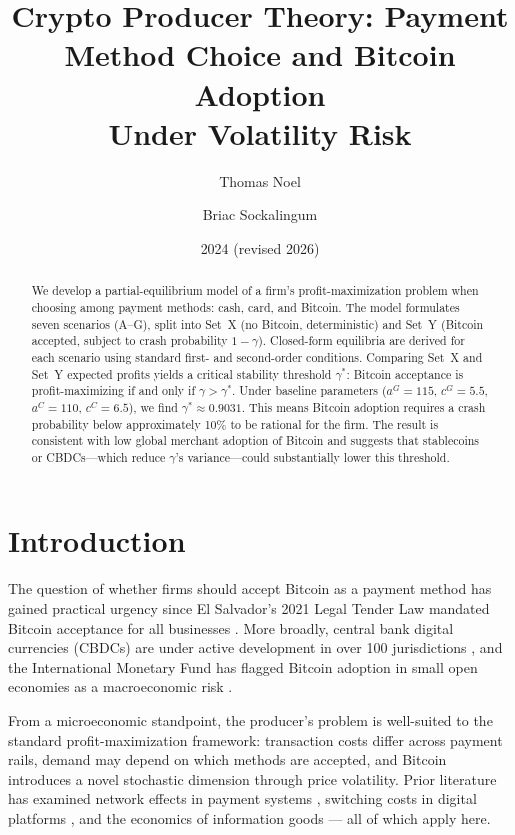\documentclass{article}
\title{Crypto Producer Theory: Payment Method Choice and Bitcoin Adoption\\
       Under Volatility Risk}
\author{Thomas Noel \and Briac Sockalingum}
\date{2024 (revised 2026)}
\begin{document}
\maketitle

\begin{abstract}
We develop a partial-equilibrium model of a firm's profit-maximization problem
when choosing among payment methods: cash, card, and Bitcoin.
The model formulates seven scenarios (A--G), split into Set~X (no Bitcoin,
deterministic) and Set~Y (Bitcoin accepted, subject to crash probability
$1 - \gamma$).
Closed-form equilibria are derived for each scenario using standard first- and
second-order conditions.
Comparing Set~X and Set~Y expected profits yields a critical stability threshold
$\gamma^*$: Bitcoin acceptance is profit-maximizing if and only if $\gamma > \gamma^*$.
Under baseline parameters ($a^G = 115$, $c^G = 5.5$, $a^C = 110$, $c^C = 6.5$),
we find $\gamma^* \approx 0.9031$.
This means Bitcoin adoption requires a crash probability below approximately 10\%
to be rational for the firm.
The result is consistent with low global merchant adoption of Bitcoin and
suggests that stablecoins or CBDCs---which reduce $\gamma$'s variance---could
substantially lower this threshold.
\end{abstract}

\section{Introduction}

The question of whether firms should accept Bitcoin as a payment method has
gained practical urgency since El Salvador's 2021 Legal Tender Law mandated
Bitcoin acceptance for all businesses \citep{elsalvador2021}.
More broadly, central bank digital currencies (CBDCs) are under active
development in over 100 jurisdictions \citep{bis2023}, and the International
Monetary Fund has flagged Bitcoin adoption in small open economies as a
macroeconomic risk \citep{imf2022}.

From a microeconomic standpoint, the producer's problem is well-suited to the
standard profit-maximization framework: transaction costs differ across payment
rails, demand may depend on which methods are accepted, and Bitcoin introduces
a novel stochastic dimension through price volatility.
Prior literature has examined network effects in payment systems
\citep{rochet2003}, switching costs in digital platforms \citep{klemperer1987},
and the economics of information goods \citep{shapiro1998} --- all of which
apply here.
\end{document}
